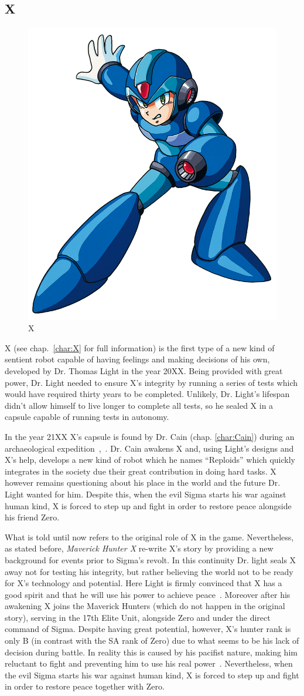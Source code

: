 \subsection{X}
\begin{figure}[htp]
	\centering
	\includegraphics[width=0.3\linewidth]{figures/X1/X_X1.png}
	\caption{X}
\end{figure}
X (see chap.~\ref{char:X} for full information) is the first type of a new kind of sentient robot capable of having feelings and making decisions of his own, developed by Dr. Thomas Light in the year 20XX. Being provided with great power, Dr. Light needed to ensure X's integrity by running a series of tests which would have required thirty years to be completed. Unlikely, Dr. Light's lifespan didn't allow himself to live longer to complete all tests, so he sealed X in a capsule capable of running tests in autonomy.

In the year 21XX X's capsule is found by Dr. Cain (chap. \ref{char:Cain}) during an archaeological expedition~\cite{X:Manual},~\cite{wiki:Cain_journal}. Dr. Cain awakens X and, using Light's designs and X's help, develops a new kind of robot  which he names ``Reploids'' which quickly integrates in the society due their great contribution in doing hard tasks. X however remains questioning about his place in the world and the future Dr. Light wanted for him. Despite this, when the evil Sigma starts his war against human kind, X is forced to step up and fight in order to restore peace alongside his friend Zero. 

What is told until now refers to the original role of X in the \x game. Nevertheless, as stated before, \textit{Maverick Hunter X} re-write X's story by providing a new background for events prior to Sigma's revolt. In this continuity Dr. light seals X away not for testing his integrity, but rather believing the world not to be ready for X's technology and potential. Here Light is firmly convinced that X has a good spirit and that he will use his power to achieve peace~\cite{wiki:MM_MHX_X}. Moreover after his awakening X joins the Maverick Hunters (which do not happen in the original story), serving in the 17th Elite Unit, alongside Zero and under the direct command of Sigma. Despite having great potential, however, X's hunter rank is only B (in contrast with the SA rank of Zero) due to what seems to be his lack of decision during battle. In reality this is caused by his pacifist nature, making him reluctant to fight and preventing him to use his real power~\cite{Xcoll1:Manual_X1}. Nevertheless, when the evil Sigma starts his war against human kind, X is forced to step up and fight in order to restore peace together with Zero.


